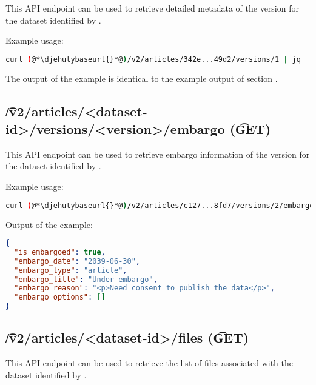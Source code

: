   This API endpoint can be used to retrieve detailed metadata of the version
   for the dataset identified by .

  Example usage:
\begin{lstlisting}[language=bash]
curl (@*\djehutybaseurl{}*@)/v2/articles/342e...49d2/versions/1 | jq
\end{lstlisting}

  The output of the example is identical to the example output of section
  .

\subsection{\t{/v2/articles/<dataset-id>/versions/<version>/embargo} (\t{GET})}

  This API endpoint can be used to retrieve embargo information of the version
   for the dataset identified by .

  Example usage:
\begin{lstlisting}[language=bash]
curl (@*\djehutybaseurl{}*@)/v2/articles/c127...8fd7/versions/2/embargo | jq
\end{lstlisting}

  Output of the example:
\begin{lstlisting}[language=JSON]
{
  "is_embargoed": true,
  "embargo_date": "2039-06-30",
  "embargo_type": "article",
  "embargo_title": "Under embargo",
  "embargo_reason": "<p>Need consent to publish the data</p>",
  "embargo_options": []
}
\end{lstlisting}


\subsection{\t{/v2/articles/<dataset-id>/files} (\t{GET})}

  This API endpoint can be used to retrieve the list of files associated with
  the dataset identified by .

